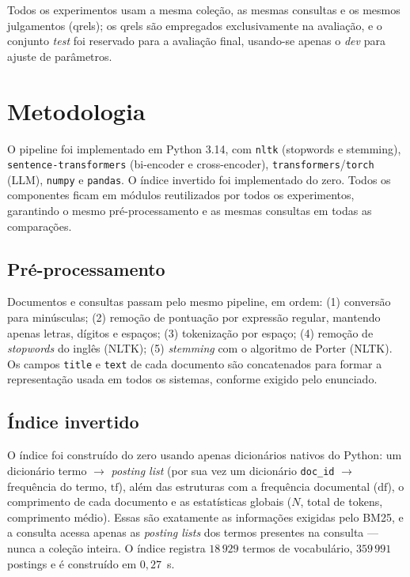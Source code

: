 \documentclass[9pt,a4paper,twocolumn]{article}
\newcommand{\bmk}{\textsc{BM25}}
\begin{document}
Todos os experimentos usam a mesma coleção, as mesmas consultas e os mesmos julgamentos
(qrels); os qrels são empregados exclusivamente na avaliação, e o conjunto \emph{test} foi
reservado para a avaliação final, usando-se apenas o \emph{dev} para ajuste de parâmetros.

\section{Metodologia}
O pipeline foi implementado em Python 3.14, com \texttt{nltk} (stopwords e stemming),
\texttt{sentence-transformers} (bi-encoder e cross-encoder), \texttt{transformers}/\texttt{torch}
(LLM), \texttt{numpy} e \texttt{pandas}. O índice invertido foi implementado do zero. Todos os
componentes ficam em módulos reutilizados por todos os experimentos, garantindo o mesmo
pré-processamento e as mesmas consultas em todas as comparações.

\subsection{Pré-processamento}
Documentos e consultas passam pelo mesmo pipeline, em ordem: (1) conversão para minúsculas;
(2) remoção de pontuação por expressão regular, mantendo apenas letras, dígitos e espaços;
(3) tokenização por espaço; (4) remoção de \emph{stopwords} do inglês (NLTK); (5) \emph{stemming}
com o algoritmo de Porter (NLTK). Os campos \texttt{title} e \texttt{text} de cada documento são
concatenados para formar a representação usada em todos os sistemas, conforme exigido pelo
enunciado.

\subsection{Índice invertido}
O índice foi construído do zero usando apenas dicionários nativos do Python: um dicionário
termo $\rightarrow$ \emph{posting list} (por sua vez um dicionário \texttt{doc\_id} $\rightarrow$
frequência do termo, $\mathrm{tf}$), além das estruturas com a frequência documental
($\mathrm{df}$), o comprimento de cada documento e as estatísticas globais ($N$, total de tokens,
comprimento médio). Essas são exatamente as informações exigidas pelo \bmk{}, e a consulta
acessa apenas as \emph{posting lists} dos termos presentes na consulta --- nunca a coleção
inteira. O índice registra $18\,929$ termos de vocabulário, $359\,991$ postings e é construído em
$0{,}27$~s.
\end{document}
